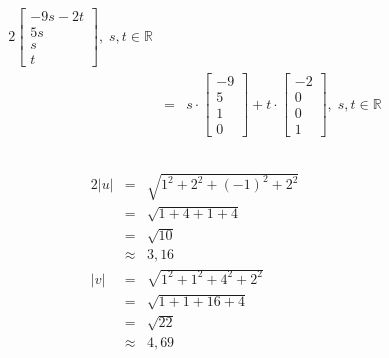 \documentclass[10pt,a4paper,oneside,ngerman,numbers=noenddot]{scrartcl}
\begin{document}
\begin{alignat*}{2}
\begin{bmatrix}
-9s - 2t \\
5s \\
s \\
t
\end{bmatrix}, \; s,t \in \mathbb{R} \\
&=& s \cdot \begin{bmatrix}
-9 \\
5 \\
1 \\
0
\end{bmatrix} + t \cdot 
\begin{bmatrix}
-2 \\
0 \\
0 \\
1
\end{bmatrix}, \; s,t \in \mathbb{R}
\end{alignat*}
\subsection{} %
\begin{alignat*}{2}
|u| &=& \sqrt{1^{2} + 2^{2} + (-1)^{2} + 2^{2}} \\
&=& \sqrt{1 + 4 + 1 + 4} \\
&=& \sqrt{10} \\
&\approx & 3,16 \\
|v| &=& \sqrt{1^{2} + 1^{2} + 4^{2} + 2^{2}} \\
&=& \sqrt{1 + 1 + 16 + 4} \\
&=& \sqrt{22} \\
&\approx & 4,69
\end{alignat*}
\end{document}
